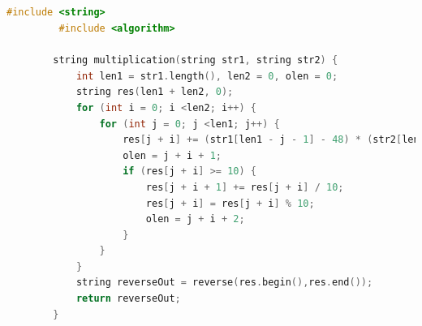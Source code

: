 \documentclass[a4paper,12pt]{report}
\begin{document}
	\subsection{}\label{subsec4:sec1:chap1}
	\begin{latin}
		\small
		\begin{lstlisting}[language=C++]
		 #include <string>
		 #include <algorithm>

		string multiplication(string str1, string str2)	{
			int len1 = str1.length(), len2 = 0, olen = 0;
			string res(len1 + len2, 0);
			for (int i = 0; i <len2; i++) {
				for (int j = 0; j <len1; j++) {
					res[j + i] += (str1[len1 - j - 1] - 48) * (str2[len2 - i - 1] - 48);
					olen = j + i + 1;
					if (res[j + i] >= 10) {
						res[j + i + 1] += res[j + i] / 10;
						res[j + i] = res[j + i] % 10;
						olen = j + i + 2;
					}
				}
			}
			string reverseOut = reverse(res.begin(),res.end());
			return reverseOut;
		}
		\end{lstlisting}
	\end{latin}
\end{document}
